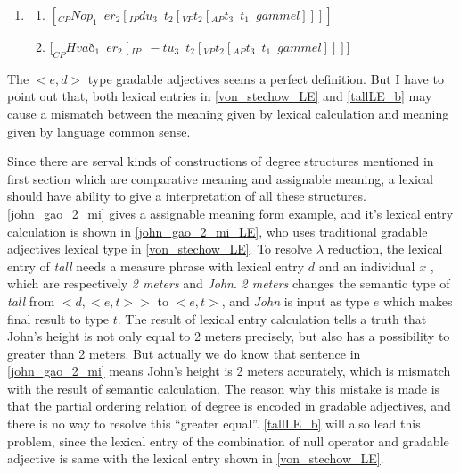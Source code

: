 \documentclass{ctexart}
\begin{document}
\begin{enumerate}
    \item \label{Icelandic_example_LE}
    
    \begin{enumerate}
        \item $[_{CP}Nop_1 \enspace er_2[_{IP}du_3 \enspace t_2[_{VP} t_2[_{AP} t_3 \enspace t_1 \enspace gammel]]]]$
        
        \item $[_{CP}Hva$ð$_1 \enspace er_2[_{IP} \enspace -tu_3 \enspace t_2 [_{VP}t_2[_{AP}t_3 \enspace t_1 \enspace gammel]]]]$
        
    \end{enumerate}   
    
\end{enumerate}

The $<e,d>$ type gradable adjectives seems a perfect definition. But I have to point out that, both lexical entries in \ref{von_stechow_LE} and \ref{tallLE_b} may cause a mismatch between the meaning given by lexical calculation and meaning given by language common sense. 

Since there are serval kinds of constructions of degree structures mentioned in first section which are comparative meaning and assignable meaning, a lexical should have ability to give a interpretation of all these structures. \ref{john_gao_2_mi} gives a assignable meaning form example, and it's lexical entry calculation is shown in \ref{john_gao_2_mi_LE}, who uses traditional gradable adjectives lexical type in \ref{von_stechow_LE}. To resolve $\lambda$ reduction, the lexical entry of \textit{tall} needs a measure phrase with lexical entry $d$ and an individual $x$ , which are respectively \textit{2 meters} and \textit{John}. \textit{2 meters} changes the semantic type of \textit{tall} from $<d,<e,t>>$ to $<e,t>$, and \textit{John} is input as type $e$ which makes final result to type $t$. The result of lexical entry calculation tells a truth that John's height is not only equal to 2 meters precisely, but also has a possibility to greater than 2 meters. But actually we do know that sentence in \ref{john_gao_2_mi} means John's height is 2 meters accurately, which is mismatch with the result of semantic calculation. The reason why this mistake is made is that the partial ordering relation of degree is encoded in gradable adjectives, and there is no way to resolve this ``greater equal''. \ref{tallLE_b} will also lead this problem, since the lexical entry of the combination of null operator and gradable adjective is same with the lexical entry shown in \ref{von_stechow_LE}.
\end{document}
